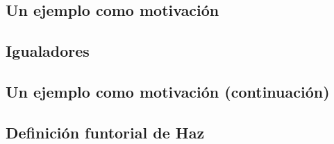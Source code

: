 \subsection{Un ejemplo como motivación}\label{subsection:EjemploMotivacion}
   
\subsection{Igualadores}
   
\subsection{Un ejemplo como motivación (continuación)}\label{subsection:EjemploMotivacionCont}
   
\subsection{Definición funtorial de Haz}   
   
